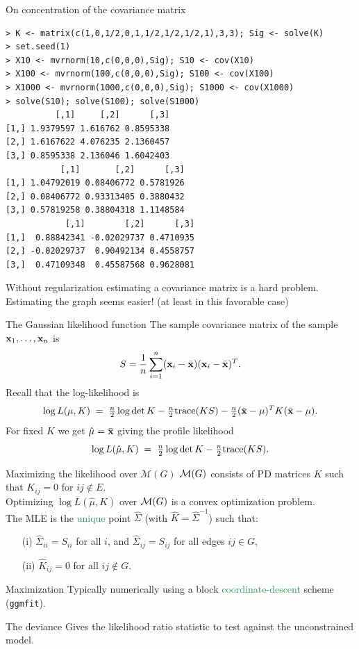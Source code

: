 \documentclass[11pt,handout,aspectratio=169,dvipsnames]{beamer}
\begin{document}
\begin{frame}[fragile,label=samplcov]{On concentration of the covariance matrix}
	\begin{lstlisting}
> K <- matrix(c(1,0,1/2,0,1,1/2,1/2,1/2,1),3,3); Sig <- solve(K)
> set.seed(1)
> X10 <- mvrnorm(10,c(0,0,0),Sig); S10 <- cov(X10)
> X100 <- mvrnorm(100,c(0,0,0),Sig); S100 <- cov(X100)
> X1000 <- mvrnorm(1000,c(0,0,0),Sig); S1000 <- cov(X1000)
> solve(S10); solve(S100); solve(S1000)
          [,1]     [,2]      [,3]
[1,] 1.9379597 1.616762 0.8595338
[2,] 1.6167622 4.076235 2.1360457
[3,] 0.8595338 2.136046 1.6042403
           [,1]       [,2]      [,3]
[1,] 1.04792019 0.08406772 0.5781926
[2,] 0.08406772 0.93313405 0.3880432
[3,] 0.57819258 0.38804318 1.1148584
            [,1]        [,2]      [,3]
[1,]  0.88842341 -0.02029737 0.4710935
[2,] -0.02029737  0.90492134 0.4558757
[3,]  0.47109348  0.45587568 0.9628081\end{lstlisting}
Without regularization estimating a covariance matrix is a hard problem.\\[.2cm]
Estimating the graph seems easier! (at least in this favorable case)
\end{frame}

\begin{frame}{The Gaussian likelihood function}
	The sample covariance matrix of the sample $\mathbf{x}_1,\ldots,\mathbf{x}_n$ is
	$$S=\frac{1}{n}\sum_{i=1}^n(\mathbf{x}_i-\bar {\mathbf{x}})(\mathbf{x}_i-\bar {\mathbf{x}})^T.$$
Recall that the log-likelihood is
$$\log L(\mu,K)\;=\;\tfrac{n}{2}\log\det K-\tfrac{n}{2}\text{trace}(KS)-\tfrac{n}{2}(\bar {\mathbf{x}}-\mu)^T K(\bar {\mathbf{x}}-\mu).$$
For fixed $K$ we get $\hat\mu=\bar {\mathbf{x}}$ giving the \alert{profile likelihood}
$$
\log L(\hat \mu,K)\;=\;\tfrac{n}{2}\log\det K-\tfrac{n}{2}\text{trace}(KS).
$$
\end{frame}

\begin{frame}{Maximizing the likelihood over $\mathcal M(G)$}
${\cal M}(G)$ consists of PD matrices $K$ such that $K_{ij}=0$ for $ij\notin E$. \\[.3cm]

	Optimizing $\log L(\hat \mu,K)$ over ${\cal M}(G)$ is a convex optimization problem.\\[.3cm]
	The MLE is the \textcolor{SeaGreen}{unique} point $\hat\Sigma$ (with $\widehat K=\widehat \Sigma^{-1}$) such that:
	\begin{enumerate}
		\item [(i)] $\hat\Sigma_{ii}=S_{ii}$ for all $i$, and $\hat\Sigma_{ij}=S_{ij}$ for all edges $ij\in G$,
		\item [(ii)] $\hat K_{ij}=0$ for all $ij\notin G$.
	\end{enumerate}
	\begin{alertblock}{Maximization}
		Typically numerically using a block \textcolor{SeaGreen}{coordinate-descent} scheme (\texttt{ggmfit}).
	\end{alertblock}
		\begin{block}{The deviance}
		Gives the likelihood ratio statistic to test against the unconstrained model. 
	\end{block}
\end{frame}
\end{document}
